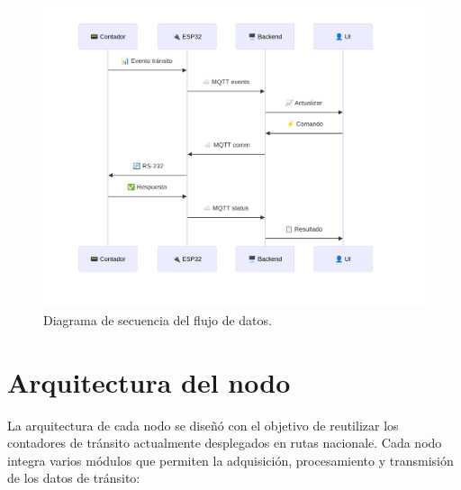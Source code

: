 \begin{figure}[H]
  \centering
  \includegraphics[width=1.15\linewidth]{./Figures/diagSecuencia.png}
  \caption{Diagrama de secuencia del flujo de datos.}
  \label{fig:diag_secuencia}
\end{figure}



\section{Arquitectura del nodo}
La arquitectura de cada nodo se diseñó con el objetivo de reutilizar los contadores de tránsito actualmente desplegados en rutas nacionale. Cada nodo integra varios módulos que permiten la adquisición, procesamiento y transmisión de los datos de tránsito:

